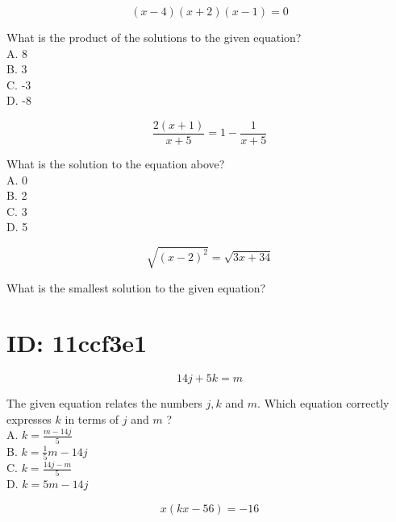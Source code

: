 $$
(x-4)(x+2)(x-1)=0
$$

What is the product of the solutions to the given equation?\\
A. 8\\
B. 3\\
C. -3\\
D. -8

$$
\frac{2(x+1)}{x+5}=1-\frac{1}{x+5}
$$

What is the solution to the equation above?\\
A. 0\\
B. 2\\
C. 3\\
D. 5

$$
\sqrt{(x-2)^{2}}=\sqrt{3 x+34}
$$

What is the smallest solution to the given equation?

















































\section*{ID: 11ccf3e1}
$$
14 j+5 k=m
$$

The given equation relates the numbers $j, k$ and $m$. Which equation correctly expresses $k$ in terms of $j$ and $m$ ?\\
A. $k=\frac{m-14 j}{5}$\\
B. $k=\frac{1}{5} m-14 j$\\
C. $k=\frac{14 j-m}{5}$\\
D. $k=5 m-14 j$

$$
x(k x-56)=-16
$$


